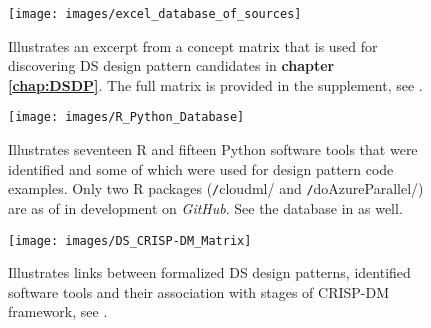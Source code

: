 \begin{landscape}
\begin{figure}[ht]
\centering
\texttt{[image: images/excel\_database\_of\_sources]}
\caption[Illustrates an excerpt from a concept matrix that is used for discovering pattern candidates.]{Illustrates an excerpt from a concept matrix that is used for discovering \acs{DS} design pattern candidates in \textbf{chapter \ref{chap:DSDP}}. 
The full matrix is provided in the supplement, see .}
\label{fit-excel-database-sourcedata}
\end{figure}
\end{landscape}

\begin{landscape}
\begin{figure}[ht]
\centering
\texttt{[image: images/R\_Python\_Database]}
\caption[Illustrates R and Python software tools that were used for design patterns.]{Illustrates seventeen R and fifteen Python software tools that were identified and some of which were used for design pattern code examples. 
Only two R packages (\texttt/cloudml/ and \texttt/doAzureParallel/) are as of \monthdataMyOwn\@ in development on \emph{GitHub}.
See the database in  as well.}
\label{fig11}
\end{figure}
\end{landscape}

\begin{landscape}
\begin{figure}[ht]
\centering
\texttt{[image: images/DS\_CRISP-DM\_Matrix]}
\caption[Illustrates links between design patterns, tools and stages of CRISP-DM framework.]{Illustrates links between formalized \ac{DS} design patterns, identified software tools and their association with stages of CRISP-DM framework, see .}
\label{secondDatabaseExcel}
\end{figure}
\end{landscape}

\cleardoublepage
